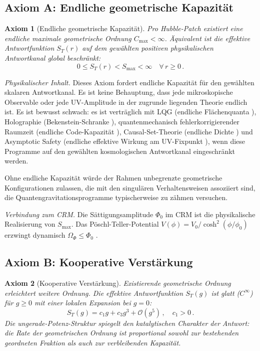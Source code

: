 \documentclass[aps,prd,twocolumn,superscriptaddress,nofootinbib]{revtex4-2}
\newtheorem{axiom}{Axiom}
\begin{document}
\subsection{Axiom A: Endliche geometrische Kapazität}

\begin{axiom}[Endliche geometrische Kapazität]
\label{ax:capacity}
Pro Hubble-Patch existiert eine endliche maximale geometrische Ordnung $C_{\max} < \infty$. Äquivalent ist die effektive Antwortfunktion $S_T(r)$ auf dem gewählten positiven physikalischen Antwortkanal global beschränkt:
\begin{equation}
0 \leq S_T(r) < S_{\max} < \infty \quad \forall\, r \geq 0\,.
\end{equation}
\end{axiom}

\textit{Physikalischer Inhalt.} Dieses Axiom fordert endliche Kapazität für den gewählten skalaren Antwortkanal. Es ist keine Behauptung, dass jede mikroskopische Observable oder jede UV-Amplitude in der zugrunde liegenden Theorie endlich ist. Es ist bewusst schwach: es ist verträglich mit LQG (endliche Flächenquanta \cite{Rovelli2004}), Holographie (Bekenstein-Schranke \cite{Bekenstein1981}), quantenmechanisch fehlerkorrigierender Raumzeit (endliche Code-Kapazität \cite{Almheiri2015}), Causal-Set-Theorie (endliche Dichte \cite{Sorkin2003}) und Asymptotic Safety (endliche effektive Wirkung am UV-Fixpunkt \cite{Reuter1998}), wenn diese Programme auf den gewählten kosmologischen Antwortkanal eingeschränkt werden.

Ohne endliche Kapazität würde der Rahmen unbegrenzte geometrische Konfigurationen zulassen, die mit den singulären Verhaltensweisen assoziiert sind, die Quantengravitationsprogramme typischerweise zu zähmen versuchen.

\textit{Verbindung zum CRM.} Die Sättigungsamplitude $\Phi_0$ im CRM \cite{Geiger2026} ist die physikalische Realisierung von $S_{\max}$. Das Pöschl-Teller-Potential $V(\phi) = V_0/\cosh^2(\phi/\phi_0)$ erzwingt dynamisch $\Omega_\Phi \leq \Phi_0$ \cite{Geiger2026c}.

\subsection{Axiom B: Kooperative Verstärkung}

\begin{axiom}[Kooperative Verstärkung]
\label{ax:cooperative}
Existierende geometrische Ordnung erleichtert weitere Ordnung. Die effektive Antwortfunktion $S_T(g)$ ist glatt ($C^\infty$) für $g \geq 0$ mit einer lokalen Expansion bei $g = 0$:
\begin{equation}
S_T(g) = c_1 g + c_3 g^3 + \mathcal{O}(g^5)\,, \quad c_1 > 0\,.
\label{eq:ir_expansion}
\end{equation}
Die ungerade-Potenz-Struktur spiegelt den katalytischen Charakter der Antwort: die Rate der geometrischen Ordnung ist proportional sowohl zur bestehenden geordneten Fraktion als auch zur verbleibenden Kapazität.
\end{axiom}
\end{document}
